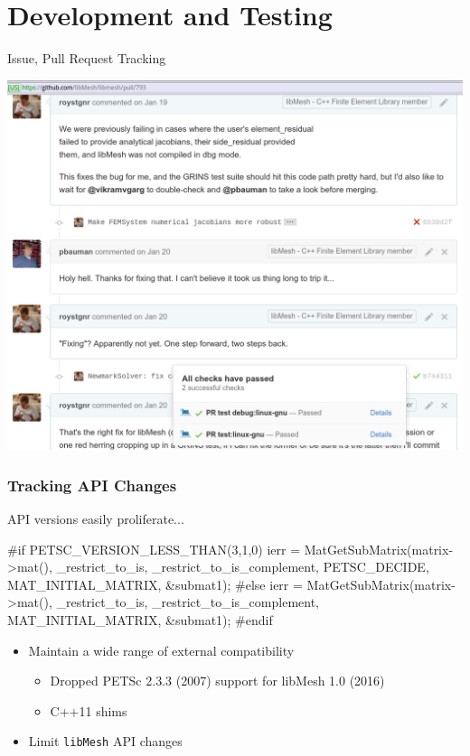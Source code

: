 \documentclass[mathserif]{beamer}
\newcommand{\libMesh}{\texttt{libMesh}\xspace}
\begin{document}
\section{Development and Testing}


\begin{frame}{Issue, Pull Request Tracking}
  \begin{center}
    \includegraphics[width=.8\textwidth]{github_ticket}
  \end{center}
\end{frame}


\begin{frame}[fragile]
\frametitle{Tracking API Changes}

\begin{block}{API versions easily proliferate...}
\small
\begin{semiverbatim}
#if PETSC_VERSION_LESS_THAN(3,1,0)
  ierr = MatGetSubMatrix(matrix->mat(),
           _restrict_to_is, _restrict_to_is_complement,
           \alert{PETSC_DECIDE}, MAT_INITIAL_MATRIX, &submat1);
#else
  ierr = MatGetSubMatrix(matrix->mat(),
           _restrict_to_is, _restrict_to_is_complement,
           MAT_INITIAL_MATRIX, &submat1);
#endif
\end{semiverbatim}
\end{block}

\begin{itemize}
	\item Maintain a wide range of external compatibility
        \begin{itemize}
            \item Dropped PETSc 2.3.3 (2007) support for libMesh 1.0 (2016)
            \item C++11 shims
        \end{itemize}
	\item Limit \libMesh{} API changes
\end{itemize}

\end{frame}
\end{document}
